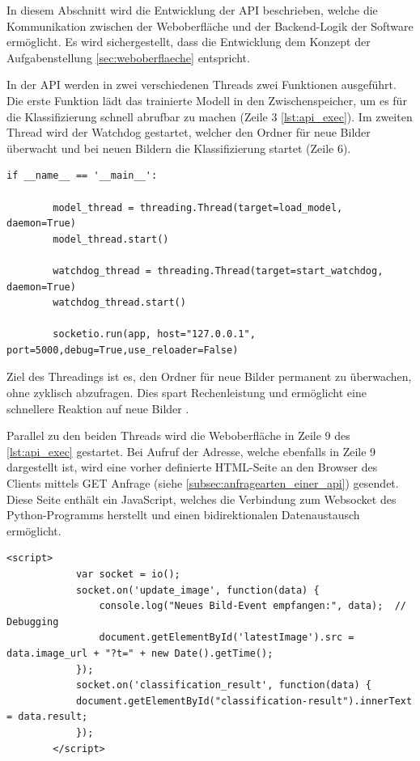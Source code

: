 In diesem Abschnitt wird die Entwicklung der API beschrieben, welche die Kommunikation zwischen der Weboberfläche und der Backend-Logik der Software ermöglicht. 
Es wird sichergestellt, dass die Entwicklung dem Konzept der Aufgabenstellung \autoref{sec:weboberflaeche} entspricht.

In der \ac{API} werden in zwei verschiedenen Threads zwei Funktionen ausgeführt. Die erste Funktion lädt das trainierte Modell in den Zwischenspeicher, um es für die Klassifizierung schnell abrufbar zu machen (Zeile 3 \autoref{lst:api_exec}). Im zweiten Thread wird der Watchdog gestartet, welcher den Ordner für neue Bilder überwacht und bei neuen Bildern die Klassifizierung startet (Zeile 6). 


\begin{lstlisting}[style=python, label=lst:api_exec, caption={Start der Weboberfläche und der Threads in der api.py}]
    if __name__ == '__main__':

        model_thread = threading.Thread(target=load_model, daemon=True)
        model_thread.start()

        watchdog_thread = threading.Thread(target=start_watchdog, daemon=True)
        watchdog_thread.start()

        socketio.run(app, host="127.0.0.1", port=5000,debug=True,use_reloader=False)

\end{lstlisting}

Ziel des Threadings ist es, den Ordner für neue Bilder permanent zu überwachen, ohne zyklisch abzufragen. Dies spart Rechenleistung und ermöglicht eine schnellere Reaktion auf neue Bilder \cite{noauthor_threading_nodate}.

Parallel zu den beiden Threads wird die Weboberfläche in Zeile 9 des \autoref{lst:api_exec} gestartet. Bei Aufruf der Adresse, welche ebenfalls in Zeile 9 dargestellt ist, wird eine vorher definierte \ac{HTML}-Seite an den Browser des Clients mittels GET Anfrage (siehe \autoref{subsec:anfragearten_einer_api}) gesendet. 
Diese Seite enthält ein JavaScript, welches die Verbindung zum Websocket des Python-Programms herstellt und einen bidirektionalen Datenaustausch ermöglicht.

\begin{lstlisting}[style=html, label=lst:weboberflaeche, caption={JavaScript Code der Weboberfläche, welcher die Bilder des Websockets empfängt}]
        <script>
            var socket = io();
            socket.on('update_image', function(data) {
                console.log("Neues Bild-Event empfangen:", data);  // Debugging
                document.getElementById('latestImage').src = data.image_url + "?t=" + new Date().getTime();
            });
            socket.on('classification_result', function(data) {
            document.getElementById("classification-result").innerText = data.result;
            });
        </script>

\end{lstlisting}

